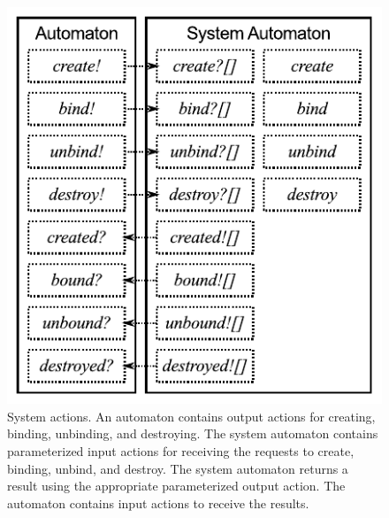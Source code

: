 

\begin{figure}
\center
\includegraphics[width=\textwidth]{system_action}
\caption{System actions.
  An automaton contains output actions for creating, binding, unbinding, and destroying.
  The system automaton contains parameterized input actions for receiving the requests to create, binding, unbind, and destroy.
  The system automaton returns a result using the appropriate parameterized output action.
  The automaton contains input actions to receive the results.}
\label{system_action}
\end{figure}

